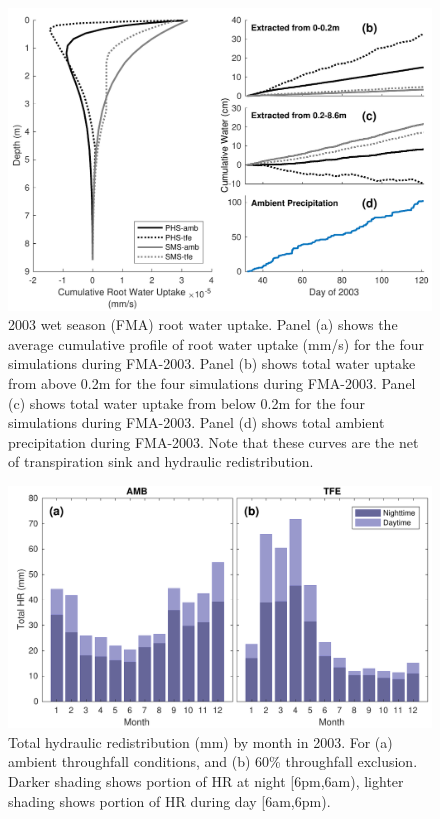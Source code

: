 \documentclass[draft,linenumbers]{agujournal}
\begin{document}
        \clearpage
    \begin{figure}[h]
     \centering
     \includegraphics[width=30pc]{../figs2/fig8.pdf}
     \caption{2003 wet season (FMA) root water uptake. 
     Panel (a) shows the average cumulative profile of root water uptake (mm/s) for the four simulations during FMA-2003.
     Panel (b) shows total water uptake from above 0.2m for the four simulations during FMA-2003.
     Panel (c) shows total water uptake from below 0.2m for the four simulations during FMA-2003. 
     Panel (d) shows total ambient precipitation during FMA-2003. 
     Note that these curves are the net of transpiration sink and hydraulic redistribution.
     }
     \label{fig8}
  \end{figure}
  
    \clearpage
    \begin{figure}[h]
     \centering
     \includegraphics[width=30pc]{../figs2/fig9.pdf}
     \caption{Total hydraulic redistribution (mm) by month in 2003. For (a) ambient throughfall conditions, and (b) 60\% throughfall exclusion. 
     Darker shading shows portion of HR at night [6pm,6am), lighter shading shows portion of HR during day [6am,6pm).}
     \label{fig:hr}
  \end{figure}
\end{document}
